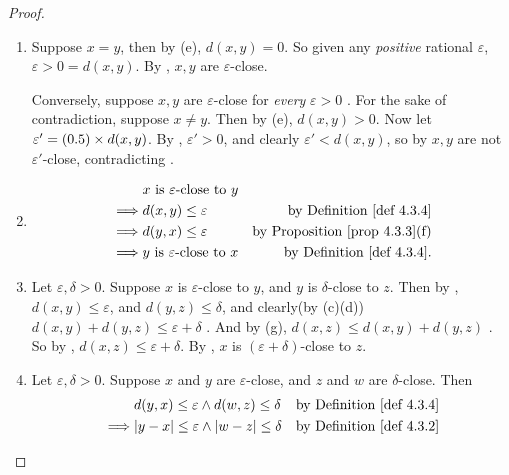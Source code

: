 \begin{proof}
\begin{enumerate}
    \item
        Suppose \(x = y\), then by (e), \(d(x, y) = 0\).
        So given any \emph{positive} rational \(\varepsilon\), \(\varepsilon > 0 = d(x, y)\).
        By , \(x, y\) are \(\varepsilon\)-close.
        
        Conversely, suppose \(x, y\) are \(\varepsilon\)-close for \emph{every} \(\varepsilon > 0\) .
        For the sake of contradiction, suppose \(x \neq y\).
        Then by (e), \(d(x, y) > 0\).
        Now let \(\varepsilon' = (0.5) \times d(x, y)\).
        By , \(\varepsilon' > 0\), and clearly \(\varepsilon' < d(x, y)\), so by  \(x, y\) are not \(\varepsilon'\)-close, contradicting .
    \item
        \begin{align*}
                     & x \text{ is \(\varepsilon\)-close to \(y\)} \\
            \implies & d(x, y) \le \varepsilon & \text{by \DEF{4.3.4}} \\
            \implies & d(y, x) \le \varepsilon & \text{by \PROP{4.3.3}(f)} \\
            \implies & y \text{ is \(\varepsilon\)-close to \(x\)} & \text{by \DEF{4.3.4}}.
        \end{align*}
    \item
        Let \(\varepsilon, \delta > 0\).
        Suppose \(x\) is \(\varepsilon\)-close to \(y\), and \(y\) is \(\delta\)-close to \(z\).
        Then by , \(d(x, y) \le \varepsilon\), and \(d(y, z) \le \delta\), and clearly(by (c)(d)) \(d(x, y) + d(y, z) \le \varepsilon + \delta\) .
        And by (g), \(d(x, z) \le d(x, y) + d(y, z)\) .
        So by , \(d(x, z) \le \varepsilon + \delta\).
        By , \(x\) is \((\varepsilon + \delta)\)-close to \(z\).
    \item
        Let \(\varepsilon, \delta > 0\).
        Suppose \(x\) and \(y\) are \(\varepsilon\)-close, and \(z\) and \(w\) are \(\delta\)-close.
        Then
        \begin{align*}
                     & d(y, x) \le \varepsilon \land d(w, z) \le \delta & \text{by \DEF{4.3.4}} \\
            \implies & \abs{y - x} \le \varepsilon \land \abs{w - z} \le \delta & \text{by \DEF{4.3.2}} \\

\end{align*}
\end{enumerate}
\end{proof}
